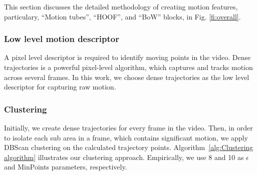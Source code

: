 This section discusses the detailed methodology of creating motion features, particulary, ``Motion tubes'', ``HOOF'', and ``BoW'' blocks, in Fig. \ref{fi:overall}.


\subsubsection{Low level motion descriptor}
A pixel level descriptor is required to identify moving points in the video. Dense trajectories \cite{wang2011action} is a powerful
pixel-level algorithm, which captures and tracks motion across several frames. In this work,
we choose dense trajectories as the low level descriptor for capturing raw motion.

\subsubsection{Clustering}

Initially, we create dense trajectories for every frame in the video.
Then, in order to isolate each sub area in a frame, which contains significant motion, we apply DBScan clustering on the
calculated trajectory points.
Algorithm~\ref{alg:Clustering algorithm}  illustrates our clustering approach. Empirically, we use 8 and 10 as $\epsilon$ and MinPoints parameters, respectively.



